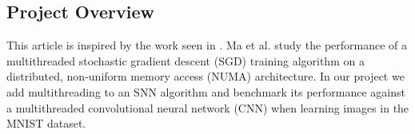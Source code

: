 \documentclass[journal]{IEEEtran}
\begin{document}
\subsection{Project Overview}

This article is inspired by the work seen in \cite{ma2019stochastic}. Ma et al. study the performance of a multithreaded stochastic gradient descent (SGD) training algorithm on a distributed, non-uniform memory access (NUMA) architecture. In our project we add multithreading to an SNN algorithm and benchmark its performance against a multithreaded convolutional neural network (CNN) when learning images in the MNIST dataset.


 





%

\end{document}
